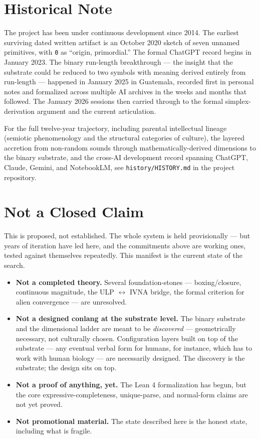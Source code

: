 \documentclass[11pt, letterpaper]{article}
\begin{document}
\section{Historical Note}

The project has been under continuous development since 2014. The earliest surviving dated written artifact is an October 2020 sketch of seven unnamed primitives, with \texttt{0} as ``origin, primordial.'' The formal ChatGPT record begins in January 2023. The binary run-length breakthrough --- the insight that the substrate could be reduced to two symbols with meaning derived entirely from run-length --- happened in January 2025 in Guatemala, recorded first in personal notes and formalized across multiple AI archives in the weeks and months that followed. The January 2026 sessions then carried through to the formal simplex-derivation argument and the current articulation.

For the full twelve-year trajectory, including parental intellectual lineage (semiotic phenomenology and the structural categories of culture), the layered accretion from non-random sounds through mathematically-derived dimensions to the binary substrate, and the cross-AI development record spanning ChatGPT, Claude, Gemini, and NotebookLM, see \texttt{history/HISTORY.md} in the project repository.

\section{Not a Closed Claim}

This is proposed, not established. The whole system is held provisionally --- but years of iteration have led here, and the commitments above are working ones, tested against themselves repeatedly. This manifest is the current state of the search.

\begin{itemize}[leftmargin=*, itemsep=0.3em]
    \item \textbf{Not a completed theory.} Several foundation-stones --- boxing/closure, continuous magnitude, the ULP $\leftrightarrow$ IVNA bridge, the formal criterion for alien convergence --- are unresolved.
    \item \textbf{Not a designed conlang at the substrate level.} The binary substrate and the dimensional ladder are meant to be \emph{discovered} --- geometrically necessary, not culturally chosen. Configuration layers built on top of the substrate --- any eventual verbal form for humans, for instance, which has to work with human biology --- are necessarily designed. The discovery is the substrate; the design sits on top.
    \item \textbf{Not a proof of anything, yet.} The Lean 4 formalization has begun, but the core expressive-completeness, unique-parse, and normal-form claims are not yet proved.
    \item \textbf{Not promotional material.} The state described here is the honest state, including what is fragile.
\end{itemize}
\end{document}
